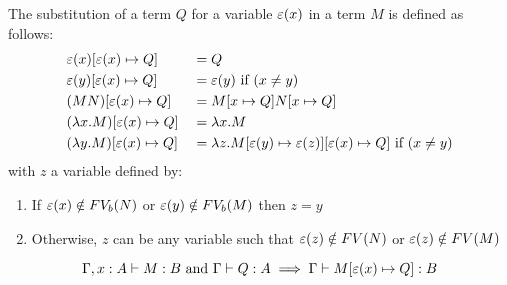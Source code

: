 \begin{definition}
  \label{def:subst}
  The substitution of a term $Q$ for a variable $\varepsilon(x)$ in a term $M$ is defined as follows:
  \[
\begin{aligned}
	& \varepsilon(x) [{\varepsilon(x)}\mapsto{Q}]            & &= Q \\
	& \varepsilon(y)  [{\varepsilon(x)}\mapsto{Q}]           & &= \varepsilon(y) \text{ if } (x \neq y)\\
	& (M N) [{\varepsilon(x)}\mapsto{Q}]               & &= M [{x}\mapsto{Q}] N [{x}\mapsto{Q}] \\
	& (\lambda {x}.{M}) [{\varepsilon(x)}\mapsto{Q}]       & &= \lambda {x}.{M} \\
	& (\lambda {y}.{M}) [{\varepsilon(x)}\mapsto{Q}]       & &= \lambda {z}.{M [{\varepsilon(y)}\mapsto{\varepsilon(z)}][{\varepsilon(x)}\mapsto{Q}]} \text{ if } (x \neq y) \\
\end{aligned}
\]
with $z$ a variable defined by:
\begin{enumerate}
	\item%
	If $\varepsilon(x) \notin FV_b(N)$ or $\varepsilon(y) \notin FV_b(M)$ then $z = y$
	\item%
	Otherwise, $z$ can be any variable such that $\varepsilon(z) \notin FV(N)$ or $\varepsilon(z) \notin FV(M)$
\end{enumerate}
\end{definition}


\begin{proposition}
  \[
    \hspace{0.0em} {\Gamma, x : A} \vdash {M : B} \hspace{0.0em} \mbox{ and } \hspace{0.0em} {\Gamma} \vdash {Q : A} \hspace{0.0em} \implies \hspace{0.0em} {\Gamma} \vdash {M  [{\varepsilon(x)}\mapsto{Q}]  : B} \hspace{0.0em}
  \]
\end{proposition}


